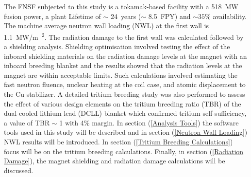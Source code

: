 \documentclass[12pt, letterpaper]{elsarticle}
\begin{document}
The FNSF subjected to this study is a tokamak-based facility with a \SI{518}{MW} fusion power, a plant Lifetime of $\sim$ \SI{24}{years} ($\sim$ \SI{8.5}{FPY}) and $\sim 35\%$ availability. The machine average neutron wall loading (NWL) at the first wall is \SI{1.1}{MW/m\textsuperscript{2}}. The radiation damage to the first wall was calculated followed by a shielding analysis. Shielding optimisation \cite{ref_2} involved testing the effect of the inboard shielding materials on the radiation damage levels at the magnet with an inboard breeding blanket and the results showed that the radiation levels at the magnet are within acceptable limits. Such calculations involved estimating the fast neutron fluence, nuclear heating at the coil case, and atomic displacement to the Cu stabilizer. A detailed tritium breeding study was also performed to assess the effect of various design elements on the tritium breeding ratio (TBR) of the dual-cooled lithium lead (DCLL) blanket which confirmed tritium self-sufficiency, a value of TBR $\sim$ 1 with 4\% margin. In section (\ref{Analysis Tools}) the software tools used in this study will be described and in section (\ref{Neutron Wall Loading}) NWL results will be introduced. In section (\ref{Tritium Breeding Calculations}) focus will be on the tritium breeding calculations. Finally, in section (\ref{Radiation Damage}), the magnet shielding and radiation damage calculations will be discussed.
\end{document}
